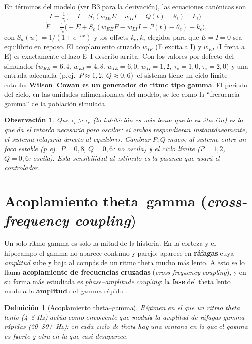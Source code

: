 \documentclass[11pt,a4paper]{article}
\newtheorem{definition}{Definición}
\newtheorem{remark}{Observación}
\begin{document}
En términos del modelo (ver B3 para la derivación), las ecuaciones canónicas son
$$\dot I = \tfrac{1}{\tau_i}\big(-I + S_i(w_{IE}E - w_{II}I + Q(t) - \theta_i) - k_i\big),$$
$$\dot E = \tfrac{1}{\tau_e}\big(-E + S_e(w_{EE}E - w_{EI}I + P(t) - \theta_e) - k_e\big),$$
con $S_a(u)=1/(1+e^{-a u})$ y los offsets $k_e,k_i$ elegidos para que $E=I=0$ sea
equilibrio en reposo. El acoplamiento cruzado $w_{IE}$ (E excita a I) y $w_{EI}$ (I
frena a E) es exactamente el lazo E--I descrito arriba. Con los valores por defecto del
simulador ($w_{EE}{=}6{,}4$, $w_{EI}{=}4{,}8$, $w_{IE}{=}6{,}0$, $w_{II}{=}1{,}2$,
$\tau_e{=}1{,}0$, $\tau_i{=}2{,}0$) y una entrada adecuada (p.\,ej.\ $P\approx1{,}2$,
$Q\approx0{,}6$), el sistema tiene un ciclo límite estable: \textbf{Wilson--Cowan es un
generador de ritmo tipo gamma}. El período del ciclo, en las unidades adimensionales
del modelo, se lee como la ``frecuencia gamma'' de la población simulada.

\begin{remark}
Que $\tau_i > \tau_e$ (la inhibición es más lenta que la excitación) es lo que da el
retardo necesario para oscilar: si ambas respondieran instantáneamente, el sistema
relajaría directo al equilibrio. Cambiar $P,Q$ mueve al sistema entre un foco estable
(p.\,ej.\ $P{=}0{,}8$, $Q{=}0{,}6$: no oscila) y el ciclo límite ($P{=}1{,}2$,
$Q{=}0{,}6$: oscila). Esta sensibilidad al estímulo es la palanca que usará el
controlador.
\end{remark}

\section{Acoplamiento theta--gamma (\emph{cross-frequency coupling})}

Un solo ritmo gamma es solo la mitad de la historia. En la corteza y el hipocampo el
gamma no aparece continuo y parejo: aparece en \textbf{ráfagas} cuya \emph{amplitud}
sube y baja al compás de un ritmo theta mucho más lento. A esto se lo llama
\textbf{acoplamiento de frecuencias cruzadas} (\emph{cross-frequency coupling}), y en
su forma más estudiada es \emph{phase--amplitude coupling}: la \textbf{fase} del theta
lento modula la \textbf{amplitud} del gamma rápido \cite{lisman2013thetagamma,buzsaki2006rhythms}.

\begin{definition}[Acoplamiento theta--gamma]
Régimen en el que un ritmo theta lento (4--8 Hz) actúa como \emph{envolvente} que
modula la amplitud de ráfagas gamma rápidas (30--80+ Hz): en cada ciclo de theta hay
una ventana en la que el gamma es fuerte y otra en la que casi desaparece.
\end{definition}
\end{document}
